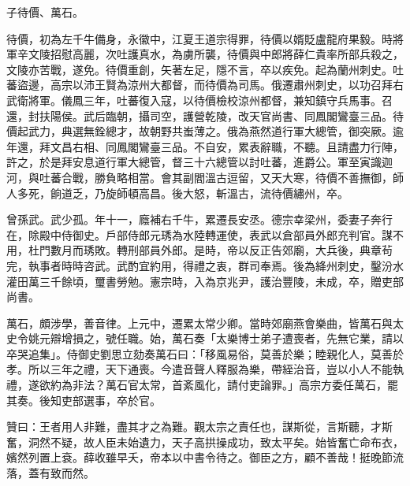 \begin{pinyinscope}
 子待價、萬石。



 待價，初為左千牛備身，永徽中，江夏王道宗得罪，待價以婿貶盧龍府果毅。時將軍辛文陵招慰高麗，次吐護真水，為虜所襲，待價與中郎將薛仁貴率所部兵殺之，文陵亦苦戰，遂免。待價重創，矢著左足，隱不言，卒以疾免。起為蘭州刺史。吐蕃盜邊，高宗以沛王賢為涼州大都督，而待價為司馬。俄遷肅州刺史，以功召拜右武衛將軍。儀鳳三年，吐蕃復入寇，以待價檢校涼州都督，兼知鎮守兵馬事。召還，封扶陽侯。武后臨朝，攝司空，護營乾陵，改天官尚書、同鳳閣鸞臺三品。待價起武力，典選無銓總才，故朝野共蚩薄之。俄為燕然道行軍大總管，御突厥。逾年還，拜文昌右相、同鳳閣鸞臺三品。不自安，累表辭職，不聽。且請盡力行陣，許之，於是拜安息道行軍大總管，督三十六總管以討吐蕃，進爵公。軍至寅識迦河，與吐蕃合戰，勝負略相當。會其副閻溫古逗留，又天大寒，待價不善撫御，師人多死，餉道乏，乃旋師頓高昌。後大怒，斬溫古，流待價繡州，卒。



 曾孫武。武少孤。年十一，廕補右千牛，累遷長安丞。德宗幸梁州，委妻子奔行在，除殿中侍御史。戶部侍郎元琇為水陸轉運使，表武以倉部員外郎充判官。謀不用，杜門數月而琇敗。轉刑部員外郎。是時，帝以反正告郊廟，大兵後，典章茍完，執事者時時咨武。武酌宜約用，得禮之衷，群司奉焉。後為絳州刺史，鑿汾水灌田萬三千餘頃，璽書勞勉。憲宗時，入為京兆尹，護治豐陵，未成，卒，贈吏部尚書。



 萬石，頗涉學，善音律。上元中，遷累太常少卿。當時郊廟燕會樂曲，皆萬石與太史令姚元辯增損之，號任職。始，萬石奏「太樂博士弟子遭喪者，先無它業，請以卒哭追集」。侍御史劉思立劾奏萬石曰：「移風易俗，莫善於樂；睦親化人，莫善於孝。所以三年之禮，天下通喪。今遣音聲人釋服為樂，帶絰治音，豈以小人不能執禮，遂欲約為非法？萬石官太常，首紊風化，請付吏論罪。」高宗方委任萬石，罷其奏。後知吏部選事，卒於官。



 贊曰：王者用人非難，盡其才之為難。觀太宗之責任也，謀斯從，言斯聽，才斯奮，洞然不疑，故人臣未始遺力，天子高拱操成功，致太平矣。始皆奮亡命布衣，嬪然列置上袞。薛收雖早夭，帝本以中書令待之。御臣之方，顧不善哉！挺晚節流落，蓋有致而然。



\end{pinyinscope}
